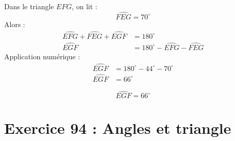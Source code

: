 \documentclass[answers]{exam}
\begin{document}
\begin{solution}
\begin{compactenum}
Dans le triangle $EFG$, on lit :
\[
\widehat{FEG} = 70^\circ
\]
Alors :
\begin{align*}
\widehat{EFG} + \widehat{FEG} + \widehat{EGF} &= 180^\circ \\
\widehat{EGF} &= 180^\circ - \widehat{EFG} - \widehat{FEG}
\end{align*}
Application numérique :
\begin{align*}
\widehat{EGF} &= 180^\circ - 44^\circ - 70^\circ \\
\widehat{EGF} &= 66^\circ
\end{align*}

\end{compactenum}

\[
\boxed{\widehat{EGF} = 66^\circ}
\]
\end{solution}

\section{Exercice 94 : Angles et triangle}
\end{document}
